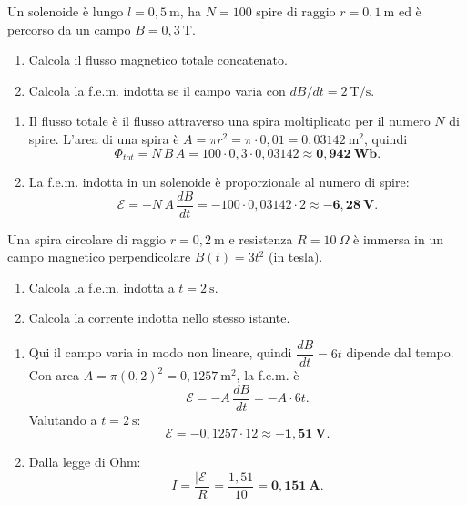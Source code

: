 \begin{question}[ID=1.3, subtitle={Solenoide con campo variabile — flusso totale e f.e.m. indotta}, tags={induzione magnetica, solenoide}, difficulty=media]
Un solenoide è lungo $l = 0{,}5\ \text{m}$, ha $N = 100$ spire di raggio $r = 0{,}1\ \text{m}$ ed è percorso da un campo $B = 0{,}3\ \text{T}$.
\begin{enumerate}
    \item Calcola il flusso magnetico totale concatenato.
    \item Calcola la f.e.m. indotta se il campo varia con $dB/dt = 2\ \text{T/s}$.
\end{enumerate}
\begin{solution}
    \begin{enumerate}
        \item Il flusso totale è il flusso attraverso una spira moltiplicato per il numero $N$ di spire. L'area di una spira è $A = \pi r^2 = \pi\cdot 0{,}01 = 0{,}03142\ \text{m}^2$, quindi
        \[
        \Phi_{tot} = N\,B\,A = 100\cdot 0{,}3\cdot 0{,}03142 \approx \mathbf{0{,}942\ \text{Wb}}.
        \]
        \item La f.e.m. indotta in un solenoide è proporzionale al numero di spire:
        \[
        \mathcal{E} = -N\,A\,\frac{dB}{dt} = -100\cdot 0{,}03142\cdot 2 \approx \mathbf{-6{,}28\ \text{V}}.
        \]
    \end{enumerate}
\end{solution}
\end{question}

\begin{question}[ID=1.4, subtitle={Spira circolare in campo B(t) = 3t² — f.e.m. e corrente a t=2 s}, tags={induzione magnetica, Faraday}, difficulty=media]
Una spira circolare di raggio $r = 0{,}2\ \text{m}$ e resistenza $R = 10\ \Omega$ è immersa in un campo magnetico perpendicolare $B(t) = 3t^2$ (in tesla).
\begin{enumerate}
    \item Calcola la f.e.m. indotta a $t = 2\ \text{s}$.
    \item Calcola la corrente indotta nello stesso istante.
\end{enumerate}
\begin{solution}
    \begin{enumerate}
        \item Qui il campo varia in modo non lineare, quindi $\dfrac{dB}{dt} = 6t$ dipende dal tempo. Con area $A = \pi(0{,}2)^2 = 0{,}1257\ \text{m}^2$, la f.e.m. è
        \[
        \mathcal{E} = -A\,\frac{dB}{dt} = -A\cdot 6t.
        \]
        Valutando a $t = 2\ \text{s}$:
        \[
        \mathcal{E} = -0{,}1257\cdot 12 \approx \mathbf{-1{,}51\ \text{V}}.
        \]
        \item Dalla legge di Ohm:
        \[
        I = \frac{|\mathcal{E}|}{R} = \frac{1{,}51}{10} = \mathbf{0{,}151\ \text{A}}.
        \]
    \end{enumerate}
\end{solution}
\end{question}

